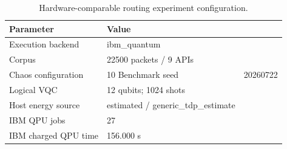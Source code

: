 \begin{table}[htbp]
\caption{Hardware-comparable routing experiment configuration.}
\label{tab:routing-experiment-configuration}
\centering
\begin{tabular}{ll}
\hline
Parameter & Value \\
\hline
Execution backend & ibm\_quantum \\
Corpus & 22500 packets / 9 APIs \\
Chaos configuration & 10%
Benchmark seed & 20260722 \\
Logical VQC & 12 qubits; 1024 shots \\
Host energy source & estimated / generic\_tdp\_estimate \\
IBM QPU jobs & 27 \\
IBM charged QPU time & 156.000 s \\
\hline
\end{tabular}
\end{table}

